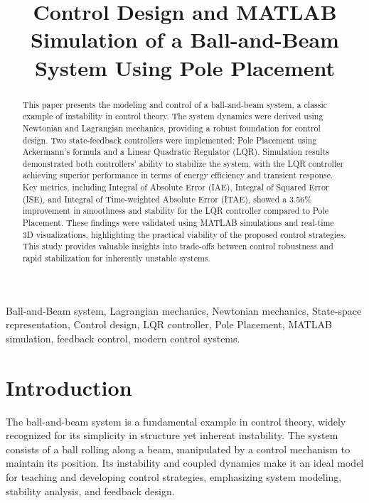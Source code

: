 \documentclass[conference]{IEEEtran}
\begin{document}
\title{Control Design and MATLAB Simulation of a Ball-and-Beam System Using Pole Placement}

\author{
}

\maketitle

\begin{abstract}
    This paper presents the modeling and control of a ball-and-beam system, a classic example of instability in control theory. The system dynamics were derived using Newtonian and Lagrangian mechanics, providing a robust foundation for control design. Two state-feedback controllers were implemented: Pole Placement using Ackermann’s formula and a Linear Quadratic Regulator (LQR). Simulation results demonstrated both controllers' ability to stabilize the system, with the LQR controller achieving superior performance in terms of energy efficiency and transient response. Key metrics, including Integral of Absolute Error (IAE), Integral of Squared Error (ISE), and Integral of Time-weighted Absolute Error (ITAE), showed a 3.56\% improvement in smoothness and stability for the LQR controller compared to Pole Placement. These findings were validated using MATLAB simulations and real-time 3D visualizations, highlighting the practical viability of the proposed control strategies. This study provides valuable insights into trade-offs between control robustness and rapid stabilization for inherently unstable systems.
\end{abstract}

\begin{IEEEkeywords}
    Ball-and-Beam system, Lagrangian mechanics, Newtonian mechanics, State-space representation, Control design, LQR controller, Pole Placement, MATLAB simulation, feedback control, modern control systems.
\end{IEEEkeywords}
    

\section{Introduction}
\label{sec:intro}
The ball-and-beam system is a fundamental example in control theory, widely recognized for its simplicity in structure yet inherent instability. The system consists of a ball rolling along a beam, manipulated by a control mechanism to maintain its position. Its instability and coupled dynamics make it an ideal model for teaching and developing control strategies, emphasizing system modeling, stability analysis, and feedback design.
\end{document}
